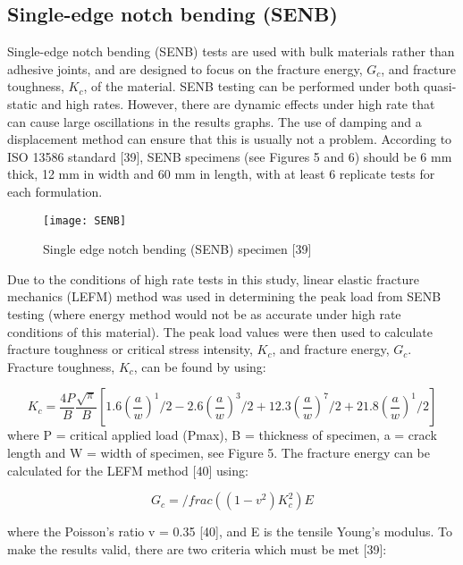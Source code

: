 \documentclass[numbers=noendperiod,chapterprefix=on]{icldt} %
\begin{document}
\subsection{Single-edge notch bending (SENB) }
Single-edge notch bending (SENB) tests are used with bulk materials rather than adhesive joints, and are designed to focus on the fracture energy, $G_c$, and fracture toughness, $K_c$, of the material. SENB testing can be performed under both quasi-static and high rates. However, there are dynamic effects under high rate that can cause large oscillations in the results graphs. The use of damping and a displacement method can ensure that this is usually not a problem. 
According to ISO 13586 standard [39], SENB specimens (see Figures 5 and 6) should be 6 mm thick, 12 mm in width and 60 mm in length, with at least 6 replicate tests for each formulation. 

\begin{figure}[!htpb]
\centering
\texttt{[image: SENB]}
\caption{Single edge notch bending (SENB) specimen [39]} \label{Single edge notch bending (SENB) specimen [39]}
\end{figure}

Due to the conditions of high rate tests in this study, linear elastic fracture mechanics (LEFM) method was used in determining the peak load from SENB testing (where energy method would not be as accurate under high rate conditions of this material). The peak load values were then used to calculate fracture toughness or critical stress intensity, $K_c$, and fracture energy, $G_c$.
Fracture toughness, $K_c$, can be found by using: 

\begin{equation} 
K_c=\frac{4P}{B}\frac{\sqrt{\pi}}{B}\left[1.6 \left( \frac{a}{w}\right)^1/2- 2.6 \left( \frac{a}{w}\right)^3/2 + 12.3 \left( \frac{a}{w}\right)^7/2 +21.8 \left( \frac{a}{w}\right)^1/2\right] 
\end{equation}
where P = critical applied load (Pmax), B = thickness of specimen, a = crack length and W = width of specimen, see Figure 5. 
The fracture energy can be calculated for the LEFM method [40] using:

\begin{equation} 
G_c= /frac{((1-v^2) K_c^2)}{E}
\end{equation}

where the Poisson’s ratio v = 0.35 [40], and E is the tensile Young’s modulus. 
To make the results valid, there are two criteria which must be met [39]:
\end{document}
